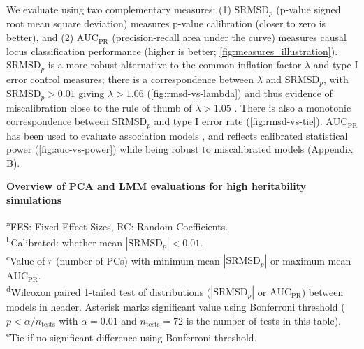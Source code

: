\documentclass[11pt]{article}
\newcommand{\rmsd}{\text{SRMSD}_p}
\newcommand{\auc}{\text{AUC}_\text{PR}}
\begin{document}
\begin{linenumbers}
We evaluate using two complementary measures:
(1) $\rmsd$ (p-value signed root mean square deviation) measures p-value calibration (closer to zero is better), and
(2) $\auc$ (precision-recall area under the curve) measures causal locus classification performance (higher is better; \cref{fig:measures_illustration}).
$\rmsd$ is a more robust alternative to the common inflation factor $\lambda$ and type I error control measures; there is a correspondence between $\lambda$ and $\rmsd$, with $\rmsd > 0.01$ giving $\lambda > 1.06$ (\cref{fig:rmsd-vs-lambda}) and thus evidence of miscalibration close to the rule of thumb of $\lambda > 1.05$ \citep{price_new_2010}.
There is also a monotonic correspondence between $\rmsd$ and type I error rate (\cref{fig:rmsd-vs-tie}).
$\auc$ has been used to evaluate association models \citep{rakitsch_lasso_2013}, and reflects calibrated statistical power (\cref{fig:auc-vs-power}) while being robust to miscalibrated models (Appendix B).

\begin{table}[hp]
  \centering
  \scriptsize
  \caption{
    \textbf{Overview of PCA and LMM evaluations for high heritability simulations}
  }
  \label{tab:human_sum_pcs}
  \begin{flushleft}
    \textsuperscript{a}FES: Fixed Effect Sizes, RC: Random Coefficients.\\
    \textsuperscript{b}Calibrated: whether mean $|\rmsd| < 0.01$.\\
    \textsuperscript{c}Value of $r$ (number of PCs) with minimum mean $|\rmsd|$ or maximum mean $\auc$.\\
    \textsuperscript{d}Wilcoxon paired 1-tailed test of distributions ($|\rmsd|$ or $\auc$) between models in header.
    Asterisk marks significant value using Bonferroni threshold ($p < \alpha/n_\text{tests}$ with $\alpha = 0.01$ and $n_\text{tests} = 72$ is the number of tests in this table).\\
    \textsuperscript{e}Tie if no significant difference using Bonferroni threshold.
  \end{flushleft}
\end{table}


\end{linenumbers}
\end{document}
